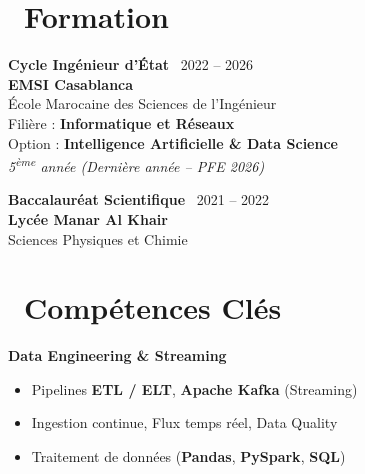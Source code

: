 \documentclass[a4paper,9pt]{extarticle}
\def\faGraduationCap{}%
\def\faCubes{}%
\def\faCalendar*{}%
\newcommand{\cvhighlight}[1]{\textcolor{accentteal}{\textbf{#1}}}
\begin{document}
\begin{minipage}[t]{0.405\textwidth}

  \section{\faGraduationCap\ Formation}

  \textbf{\color{primary}\small Cycle Ingénieur d'État} \hfill {\scriptsize\color{textmuted}\faCalendar*\ 2022 -- 2026}\\
  {\small \textbf{EMSI Casablanca}}\\
  {\footnotesize École Marocaine des Sciences de l'Ingénieur}\\
  {\footnotesize Filière : \cvhighlight{Informatique et Réseaux}}\\
  {\footnotesize Option : \textbf{Intelligence Artificielle \& Data Science}}\\
  {\scriptsize\textit{5\textsuperscript{ème} année (Dernière année -- PFE 2026)}}

  \vspace{3pt}

  \textbf{\color{primary}\small Baccalauréat Scientifique} \hfill {\scriptsize\color{textmuted}\faCalendar*\ 2021 -- 2022}\\
  {\small \textbf{Lycée Manar Al Khair}}\\
  {\footnotesize Sciences Physiques et Chimie}

  \vspace{3pt}

  \section{\faCubes\ Compétences Clés}

  {\footnotesize \textbf{\color{accent} Data Engineering \& Streaming}}
  \begin{itemize}
    \item Pipelines \textbf{ETL / ELT}, \textbf{Apache Kafka} (Streaming)
    \item Ingestion continue, Flux temps réel, Data Quality
    \item Traitement de données (\textbf{Pandas}, \textbf{PySpark}, \textbf{SQL})
  \end{itemize}


\end{minipage}
\end{document}
